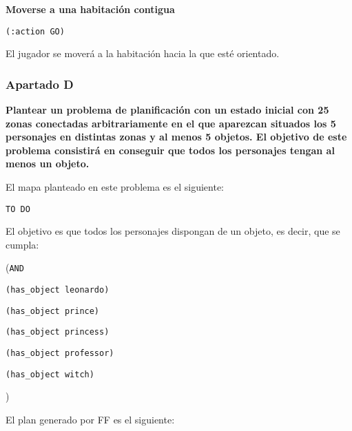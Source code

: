 \documentclass[11pt,a4paper]{article}
\begin{document}
\medskip
\large{\textbf{Moverse a una habitación contigua}}

\texttt{(:action GO)}

\smallskip

El jugador se moverá a la habitación hacia la que esté orientado.

\medskip

\subsubsection{Apartado D}

\textbf{Plantear un problema de planificación con un estado inicial con 25 zonas conectadas arbitrariamente en el que aparezcan situados los 5  personajes en distintas zonas y al menos 5 objetos. El objetivo de este problema consistirá en conseguir que todos los personajes  tengan al menos un objeto.}

\bigskip

El mapa planteado en este problema es el siguiente:

\texttt{TO DO}

\medskip

El objetivo es que todos los personajes dispongan de un objeto, es decir, que se cumpla:

\medskip

(\texttt{AND}

\quad \texttt{(has\_object leonardo)}

\quad \texttt{(has\_object prince)}

\quad \texttt{(has\_object princess)}

\quad \texttt{(has\_object professor)}

\quad \texttt{(has\_object witch)}

)

\bigskip

El plan generado por FF es el siguiente:
\end{document}
